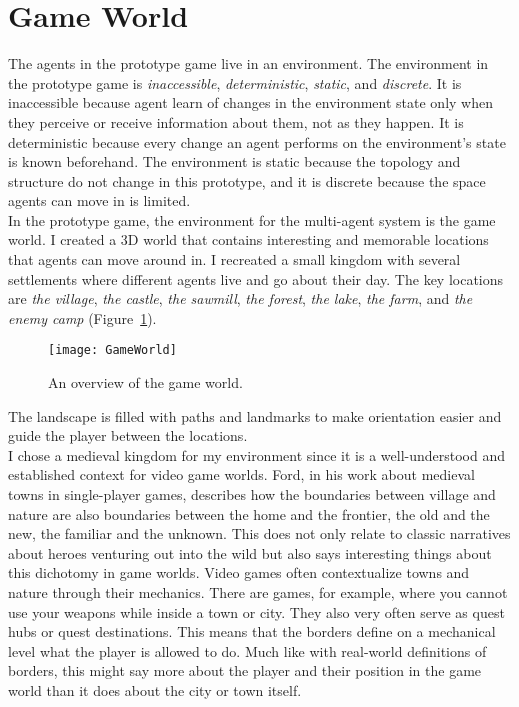 \section{Game World}
The agents in the prototype game live in an environment. The environment in the prototype game is \textit{inaccessible}, \textit{deterministic}, \textit{static}, and \textit{discrete}. It is inaccessible because agent learn of changes in the environment state only when they perceive or receive information about them, not as they happen. It is deterministic because every change an agent performs on the environment's state is known beforehand. The environment is static because the topology and structure do not change in this prototype, and it is discrete because the space agents can move in is limited.\\
In the prototype game, the environment for the multi-agent system is the game world. I created a 3D world that contains interesting and memorable locations that agents can move around in. I recreated a small kingdom with several settlements where different agents live and go about their day. The key locations are \textit{the village}, \textit{the castle}, \textit{the sawmill}, \textit{the forest}, \textit{the lake}, \textit{the farm}, and \textit{the enemy camp} (Figure~\ref{fig:gameWorld}).
\begin{figure}
	\centering
	\texttt{[image: GameWorld]}
	\caption{An overview of the game world.}
	\label{fig:gameWorld}
\end{figure}
The landscape is filled with paths and landmarks to make orientation easier and guide the player between the locations.\\
I chose a medieval kingdom for my environment since it is a well-understood and established context for video game worlds. Ford, in his work about medieval towns in single-player games, describes how the boundaries between village and nature are also boundaries between the home and the frontier, the old and the new, the familiar and the unknown. This does not only relate to classic narratives about heroes venturing out into the wild but also says interesting things about this dichotomy in game worlds. Video games often contextualize towns and nature through their mechanics. There are games, for example, where you cannot use your weapons while inside a town or city. They also very often serve as quest hubs or quest destinations. This means that the borders define on a mechanical level what the player is allowed to do. Much like with real-world definitions of borders, this might say more about the player and their position in the game world than it does about the city or town itself.~\cite{Ford2019}
